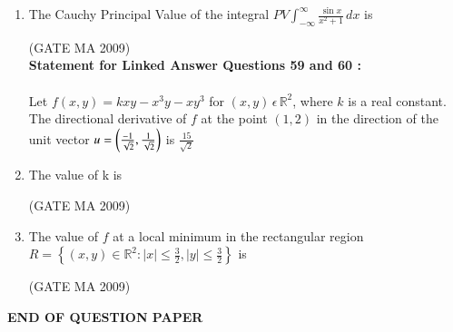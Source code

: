 \documentclass[journal,12pt,onecolumn]{IEEEtran}
\theoremstyle{remark}
\begin{document}
\begin{enumerate}[leftmargin=0pt, align=left, start=21]
\item The Cauchy Principal Value of the integral
$
PV\int_{-\infty}^\infty \frac{\sin x}{x^2+1}\,dx
$
is
\begin{enumerate}
\end{enumerate}
\hfill (GATE MA 2009)\\
\textbf{Statement for Linked Answer Questions 59 and 60 :}\\
\\
Let $f(x,y)=kxy-x^3y-xy^3$ for $(x,y)\,\epsilon\,\mathbb{R}^2$, where $k$ is a real constant. The directional derivative of $f$ at the point $(1,2)$ in the direction of the unit vector $u=\left(\frac{-1}{\sqrt{2}},\frac{1}{\sqrt{2}}\right)$ is $\frac{15}{\sqrt{2}}$\\
\item The value of k is 
\begin{enumerate}
\end{enumerate}
\hfill (GATE MA 2009)

\item The value of $f$ at a local minimum in the rectangular region $R=\left\{(x,y)\in\mathbb{R}^2: |x|\leq\frac{3}{2}, |y|\leq\frac{3}{2}\right\}$ is
\begin{enumerate}
\end{enumerate}
\hfill (GATE MA 2009)


\end{enumerate}
\begin{center}
\textbf{END OF QUESTION PAPER}
\end{center}
\end{document}
